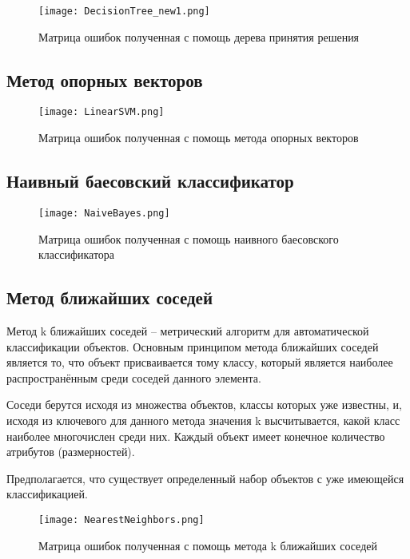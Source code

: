 \begin{figure}[h]
\centering
  \texttt{[image: DecisionTree\_new1.png]}
  \caption{Матрица ошибок полученная с помощь дерева принятия решения}
  \label{fig:results:DecisionTree1}
\end{figure}


\subsection{Метод опорных векторов}


\begin{figure}[h]
\centering
  \texttt{[image: LinearSVM.png]}
  \caption{Матрица ошибок полученная с помощь метода опорных векторов}
  \label{fig:results:LinearSVM}
\end{figure}



\subsection{Наивный баесовский классификатор}

\begin{figure}[h]
\centering
  \texttt{[image: NaiveBayes.png]}
  \caption{Матрица ошибок полученная с помощь наивного баесовского классификатора}
  \label{fig:results:NaiveBayes}
\end{figure}


\subsection{Метод ближайших соседей}

Метод k ближайших соседей -- метрический алгоритм для автоматической классификации объектов. Основным принципом метода ближайших соседей является то, что объект присваивается тому классу, который является наиболее распространённым среди соседей данного элемента.

Соседи берутся исходя из множества объектов, классы которых уже известны, и, исходя из ключевого для данного метода значения k высчитывается, какой класс наиболее многочислен среди них. Каждый объект имеет конечное количество атрибутов (размерностей).

Предполагается, что существует определенный набор объектов с уже имеющейся классификацией.

\begin{figure}[h]
\centering
  \texttt{[image: NearestNeighbors.png]}
  \caption{Матрица ошибок полученная с помощь метода k ближайших соседей}
  \label{fig:results:NearestNeighbors}
\end{figure}

